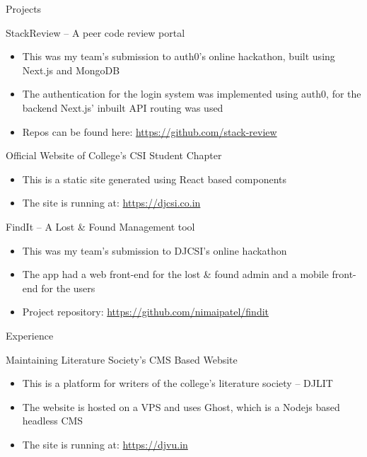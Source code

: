 \documentclass{article}
\newlength{\tabin}
\newlength{\secsep}
\newcommand{\lineunder}{\vspace*{-8pt} \\ \hspace*{-6pt} \hrulefill \\ \vspace*{-15pt}}
\newenvironment{tabbedsection}[1]{
  \begin{list}{}{
      \setlength{\itemsep}{0pt}
      \setlength{\labelsep}{0pt}
      \setlength{\labelwidth}{0pt}
      \setlength{\leftmargin}{\tabin}
      \setlength{\rightmargin}{\tabin}
      \setlength{\listparindent}{0pt}
      \setlength{\parsep}{0pt}
      \setlength{\parskip}{0pt}
      \setlength{\partopsep}{0pt}
      \setlength{\topsep}{#1}
    }
  \item[]
}{\end{list}}
\newenvironment{resume_section}[1]{
  \filbreak
  \vspace{2\secsep}
  \textsc{\large#1}
  \lineunder
  \begin{tabbedsection}{\secsep}
}{\end{tabbedsection}}
\newenvironment{resume_subsection}[2][]{
  \textbf{#2} \hfill {\footnotesize #1} \hspace{2em}
  \begin{tabbedsection}{0.5\secsep}
}{\end{tabbedsection}}
\newenvironment{subitems}{
  \renewcommand{\labelitemi}{-}
  \begin{itemize}
      \setlength{\labelsep}{1em}
}{\end{itemize}}
\begin{document}
\begin{resume_section}{Projects}

    \begin{resume_subsection}{StackReview -- A peer code review portal}
        \begin{subitems}
            \item This was my team's submission to auth0's online hackathon, built using Next.js and MongoDB
            \item The authentication for the login system was implemented using auth0, for the backend Next.js' inbuilt API routing was used
            \item Repos can be found here: \href{https://github.com/stack-review}{https://github.com/stack-review}
        \end{subitems}
    \end{resume_subsection}

    \begin{resume_subsection}{Official Website of College's CSI Student Chapter}
        \begin{subitems}
            \item This is a static site generated using React based components
            \item The site is running at: \href{https://djcsi.co.in}{https://djcsi.co.in}
        \end{subitems}
    \end{resume_subsection}

	\begin{resume_subsection}{FindIt -- A Lost {\&} Found Management tool}
        \begin{subitems}
            \item This was my team's submission to DJCSI's online hackathon
	    \item The app had a web front-end for the lost {\&} found admin and a mobile front-end for the users
            \item Project repository: \href{https://github.com/nimaipatel/findit}{https://github.com/nimaipatel/findit}
        \end{subitems}
    \end{resume_subsection}

\end{resume_section}

\begin{resume_section}{Experience}
    \begin{resume_subsection}{Maintaining Literature Society's CMS Based Website}
        \begin{subitems}
            \item This is a platform for writers of the college's literature society -- DJLIT
            \item The website is hosted on a VPS and uses Ghost, which is a Nodejs based headless CMS
            \item The site is running at: \href{https://djvu.in}{https://djvu.in}
        \end{subitems}
    \end{resume_subsection}
\end{resume_section}
\end{document}

